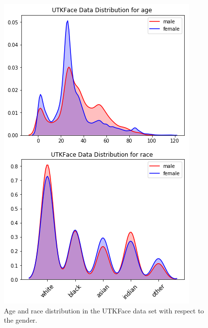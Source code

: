 \documentclass[obeyspaces, spaces, fleqn,10pt]{SelfArx} %
\begin{document}
\begin{figure}[ht]\centering %
\includegraphics[width=\linewidth]{img/UTKfaces_age-gender-distribution}
\caption{Age and race distribution in the UTKFace data set with respect to the gender.}
\label{fig:fig2}
\end{figure}
\end{document}
